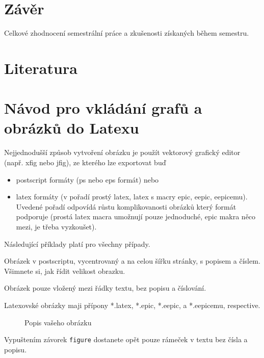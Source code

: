 \documentclass[12pt]{article}
\begin{document}
\section{Závěr}

Celkové zhodnocení semestrální práce a zkušenosti získaných během
semestru.

\section{Literatura}

\appendix

\section{Návod pro vkládání grafů a obrázků do Latexu}

Nejjednodušší způsob vytvoření obrázku je použít vektorový grafický
editor (např. xfig nebo jfig), ze kterého lze exportovat buď
\begin{itemize}
\item postscript formáty (ps nebo eps formát) nebo
\item latex formáty (v pořadí prostý latex, latex s macry epic, eepic, eepicemu). Uvedené pořadí odpovídá růstu
komplikovanosti obrázků který formát podporuje (prostá latex macra
umožnují pouze jednoduché, epic makra něco mezi, je třeba
vyzkoušet).

\end{itemize}
Následující příklady platí pro všechny případy.

Obrázek v postscriptu, vycentrovaný a na celou šířku stránky, s
popisem a číslem. Všimnete si, jak řídit velikost obrazku.
\begin{figure}[ht]
\end{figure}

Obrázek pouze vložený mezi řádky textu, bez popisu a číslování.\\
\epsfxsize=1cm

Latexovské obrázky maji přípony *.latex, *.epic, *.eepic, a
*.eepicemu, respective.
\begin{figure}[ht]
\begin{center}
\end{center}
\caption{Popis vašeho obrázku} \label{l1}
\end{figure}
Vypuštením závorek {\tt figure} dostanete opět pouze rámeček v textu
bez čísla a popisu.
\end{document}
